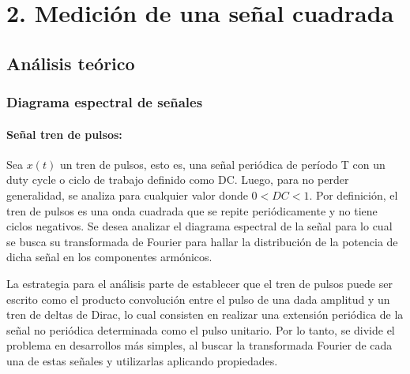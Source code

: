 \section{2. Medici\'on de una se\~nal cuadrada}

\subsection{An\'alisis te\'orico}

\subsubsection{Diagrama espectral de se\~nales}

\paragraph{Se\~nal tren de pulsos:} Sea $x(t)$ un tren de pulsos, esto es, una se\~nal peri\'odica de per\'iodo T con un duty cycle o ciclo de trabajo definido como DC. Luego,
para no perder generalidad, se analiza para cualquier valor donde $0 < DC < 1$. Por definici\'on, el tren de pulsos es una onda cuadrada que se repite peri\'odicamente y no tiene ciclos negativos.
Se desea analizar el diagrama espectral de la se\~nal para lo cual se busca su transformada de Fourier para hallar la distribuci\'on de la potencia de dicha se\~nal en los componentes arm\'onicos.


La estrategia para el an\'alisis parte de establecer que el tren de pulsos puede ser escrito como el producto convoluci\'on entre el pulso de una dada amplitud y un tren de deltas de Dirac, lo cual consisten en realizar
una extensi\'on peri\'odica de la se\~nal no peri\'odica determinada como el pulso unitario. Por lo tanto, se divide el problema en desarrollos m\'as simples, al buscar la transformada Fourier de cada una de estas se\~nales
y utilizarlas aplicando propiedades.


